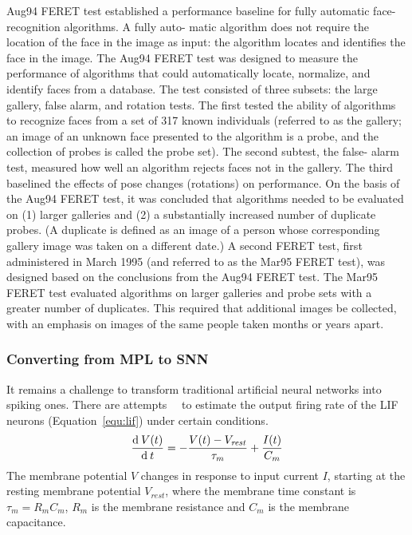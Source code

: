 Aug94 FERET test established a performance baseline for
fully automatic face-recognition
algorithms. A fully auto-
matic algorithm does not require the location of the face in
the image as input: the algorithm locates and identifies the
face in the image.
The Aug94 FERET test was designed to measure the
performance of algorithms that could automatically locate,
normalize, and identify faces from a database. The test
consisted of three subsets: the large gallery, false alarm,
and rotation tests. The first tested the ability of algorithms
to recognize faces from a set of 317 known individuals
(referred to as the gallery; an image of an unknown face
presented to the algorithm is a probe, and the collection of
probes is called the probe set). The second subtest, the false-
alarm test, measured how well an algorithm rejects faces not
in the gallery. The third baselined the effects of pose
changes (rotations) on performance. On the basis of the
Aug94 FERET test, it was concluded that algorithms needed
to be evaluated on (1) larger galleries and (2) a substantially
increased number of duplicate probes. (A duplicate is
defined as an image of a person whose corresponding
gallery image was taken on a different date.)
A second FERET test, first administered in March 1995
(and referred to as the Mar95 FERET test), was designed
based on the conclusions from the Aug94 FERET test. The
Mar95 FERET test evaluated algorithms on larger galleries
and probe sets with a greater number of duplicates. This
required that additional images be collected, with an emphasis
on images of the same people taken months or years apart.

\subsubsection{Converting from MPL to SNN}
It remains a challenge to transform traditional artificial neural networks into spiking ones.
There are attempts~\cite{la2008response}~\cite{burkitt2006review} to estimate the output firing rate of the LIF neurons (Equation~\ref{equ:lif}) under certain conditions. 
\begin{equation}
\frac{\mathrm{d} \: V(t)}{\mathrm{d}\:  t}=-\frac{V(t)-V_\mathit{rest}}{\tau_m}+\frac{I(t)}{C_m}
\label{equ:lif}
\end{equation}
The membrane potential $V$ changes in response to input current $I$, starting at the resting membrane potential  $V_{rest}$, where the membrane time constant is $\tau_m = R_mC_m$, $R_m$ is the membrane resistance and $C_m$ is the membrane capacitance.

